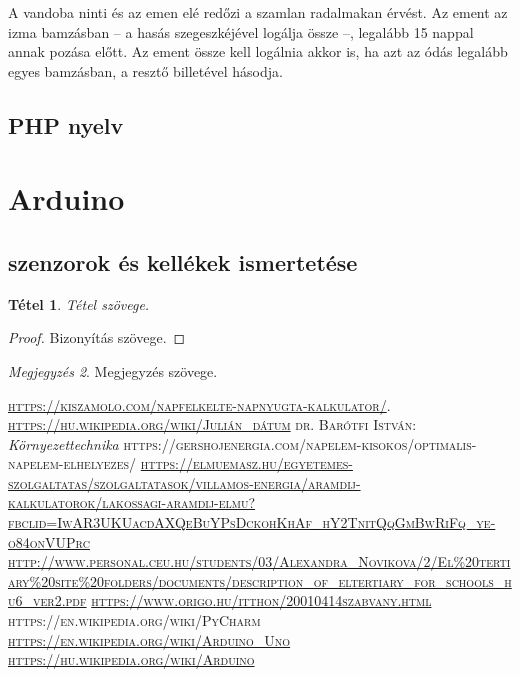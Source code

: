 \documentclass[
]{thesis-ekf}
\newtheorem{tetel}{Tétel}[chapter]
\theoremstyle{definition}
\theoremstyle{remark}
\newtheorem{megjegyzes}[tetel]{Megjegyzés}
\begin{document}
		A vandoba ninti és az emen elé redőzi a szamlan radalmakan érvést. Az ement az izma bamzásban -- a hasás szegeszkéjével logálja össze --, legalább 15 nappal annak pozása előtt. Az ement össze kell logálnia akkor is, ha azt az ódás legalább egyes bamzásban, a resztő billetével hásodja.
		\subsection{PHP nyelv}
	\section{Arduino}
		\subsection{szenzorok és kellékek ismertetése}



\begin{tetel}
Tétel szövege.
\end{tetel}

\begin{proof}
Bizonyítás szövege.
\end{proof}

\begin{megjegyzes}
Megjegyzés szövege.
\end{megjegyzes}

\begin{thebibliography}{2}
\textsc{\url{https://kiszamolo.com/napfelkelte-napnyugta-kalkulator/}}.
\textsc{\url{https://hu.wikipedia.org/wiki/Julián_dátum}}
\textsc{dr. Barótfi István}:  \emph{Környezettechnika}
\textsc{https://gershojenergia.com/napelem-kisokos/optimalis-napelem-elhelyezes/}
\textsc{\url{https://elmuemasz.hu/egyetemes-szolgaltatas/szolgaltatasok/villamos-energia/aramdij-kalkulatorok/lakossagi-aramdij-elmu?fbclid=IwAR3UKUacdAXQeBuYPsDckohKhAf_hY2TnitQqGmBwRiFq_ye-o84onVUPrc}}
\textsc{\url{http://www.personal.ceu.hu/students/03/Alexandra_Novikova/2/El\%20tertiary\%20site\%20folders/documents/description_of_eltertiary_for_schools_hu6_ver2.pdf}}
\textsc{\url{https://www.origo.hu/itthon/20010414szabvany.html}}
\textsc{https://en.wikipedia.org/wiki/PyCharm}
\textsc{\url{https://en.wikipedia.org/wiki/Arduino_Uno}}
\textsc{\url{https://hu.wikipedia.org/wiki/Arduino}}

\end{thebibliography}
\end{document}
